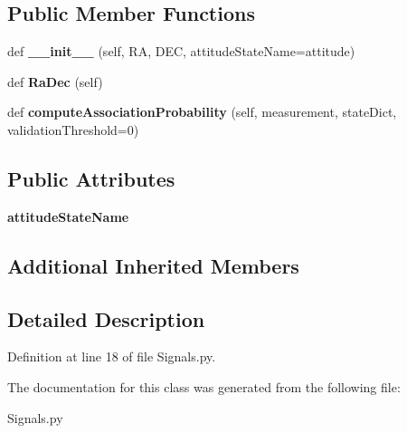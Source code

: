\subsection*{Public Member Functions}
\begin{DoxyCompactItemize}
\item 
def {\bfseries \+\_\+\+\_\+init\+\_\+\+\_\+} (self, RA, D\+EC, attitude\+State\+Name=\textquotesingle{}attitude\textquotesingle{})\hypertarget{classSignals_1_1PointSource_a08c5c8fe52979814a725fac08b34c02f}{}\label{classSignals_1_1PointSource_a08c5c8fe52979814a725fac08b34c02f}

\item 
def {\bfseries Ra\+Dec} (self)\hypertarget{classSignals_1_1PointSource_a5fbb36eda0901536d77eff9a3262ae9e}{}\label{classSignals_1_1PointSource_a5fbb36eda0901536d77eff9a3262ae9e}

\item 
def {\bfseries compute\+Association\+Probability} (self, measurement, state\+Dict, validation\+Threshold=0)\hypertarget{classSignals_1_1PointSource_ab1389987fc68312eed77ae3126a21a2a}{}\label{classSignals_1_1PointSource_ab1389987fc68312eed77ae3126a21a2a}

\end{DoxyCompactItemize}
\subsection*{Public Attributes}
\begin{DoxyCompactItemize}
\item 
{\bfseries attitude\+State\+Name}\hypertarget{classSignals_1_1PointSource_a151f2600c3623d1ca49fb51feb8a1178}{}\label{classSignals_1_1PointSource_a151f2600c3623d1ca49fb51feb8a1178}

\end{DoxyCompactItemize}
\subsection*{Additional Inherited Members}


\subsection{Detailed Description}


Definition at line 18 of file Signals.\+py.



The documentation for this class was generated from the following file\+:\begin{DoxyCompactItemize}
\item 
Signals.\+py\end{DoxyCompactItemize}
